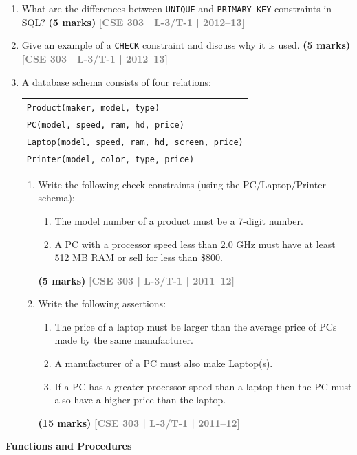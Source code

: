 \documentclass[12pt,a3paper]{article}
\newcommand{\yr}[1]{\hfill\textcolor{gray}{\small\textbf{[#1]}}}
\newcommand{\mk}[1]{\textcolor{orange!70!black}{\small\textbf{(#1 marks)}}}
\newcommand{\subtopic}[2]{%
  \vspace{10pt}
  \noindent\begin{tcolorbox}[colback=#1!8,colframe=#1,boxrule=0.6pt,arc=4pt,
    left=6pt,right=6pt,top=4pt,bottom=4pt]
    \small\bfseries\textcolor{#1}{#2}
  \end{tcolorbox}
  \vspace{2pt}
}
\begin{document}
\begin{enumerate}
\item What are the differences between \texttt{UNIQUE} and \texttt{PRIMARY KEY} constraints in SQL?
\mk{5} \yr{CSE 303 | L-3/T-1 | 2012--13}

\item Give an example of a \texttt{CHECK} constraint and discuss why it is used.
\mk{5} \yr{CSE 303 | L-3/T-1 | 2012--13}

\item A database schema consists of four relations:
\begin{center}
\begin{tabular}{l}
\texttt{Product(maker, model, type)}\\
\texttt{PC(model, speed, ram, hd, price)}\\
\texttt{Laptop(model, speed, ram, hd, screen, price)}\\
\texttt{Printer(model, color, type, price)}
\end{tabular}
\end{center}
\begin{enumerate}
\item Write the following check constraints (using the PC/Laptop/Printer schema):
\begin{enumerate}
  \item The model number of a product must be a 7-digit number.
  \item A PC with a processor speed less than 2.0 GHz must have at least 512 MB RAM or sell for less than \$800.
\end{enumerate}
\mk{5} \yr{CSE 303 | L-3/T-1 | 2011--12}

\item Write the following assertions:
\begin{enumerate}
  \item The price of a laptop must be larger than the average price of PCs made by the same manufacturer.
  \item A manufacturer of a PC must also make Laptop(s).
  \item If a PC has a greater processor speed than a laptop then the PC must also have a higher price than the laptop.
\end{enumerate}
\mk{15} \yr{CSE 303 | L-3/T-1 | 2011--12}
\end{enumerate}

\end{enumerate}

\subtopic{cB}{Functions and Procedures}
\label{sub:s3-funcs}
\end{document}
